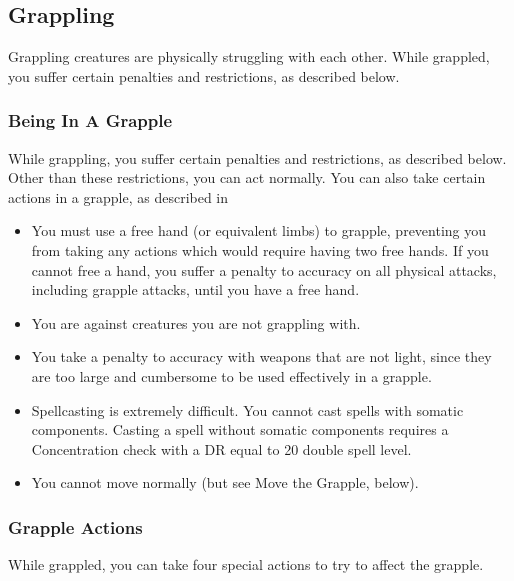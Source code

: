     \subsection{Grappling}\label{Grappling}
        Grappling creatures are physically struggling with each other. While grappled, you suffer certain penalties and restrictions, as described below.

        \subsubsection{Being In A Grapple}
            While grappling, you suffer certain penalties and restrictions, as described below. Other than these restrictions, you can act normally. You can also take certain actions in a grapple, as described in 
            \begin{itemize}
                \item You must use a free hand (or equivalent limbs) to grapple, preventing you from taking any actions which would require having two free hands. If you cannot free a hand, you suffer a  penalty to accuracy on all physical attacks, including grapple attacks, until you have a free hand.
                \item You are  against creatures you are not grappling with.
                \item You take a  penalty to accuracy with weapons that are not light, since they are too large and cumbersome to be used effectively in a grapple.
                \item Spellcasting is extremely difficult. You cannot cast spells with somatic components. Casting a spell without somatic components requires a Concentration check with a DR equal to 20 \add double spell level.
                \item You cannot move normally (but see Move the Grapple, below).
            \end{itemize}

        \subsubsection{Grapple Actions}\label{Grapple Actions}
            While grappled, you can take four special actions to try to affect the grapple.

